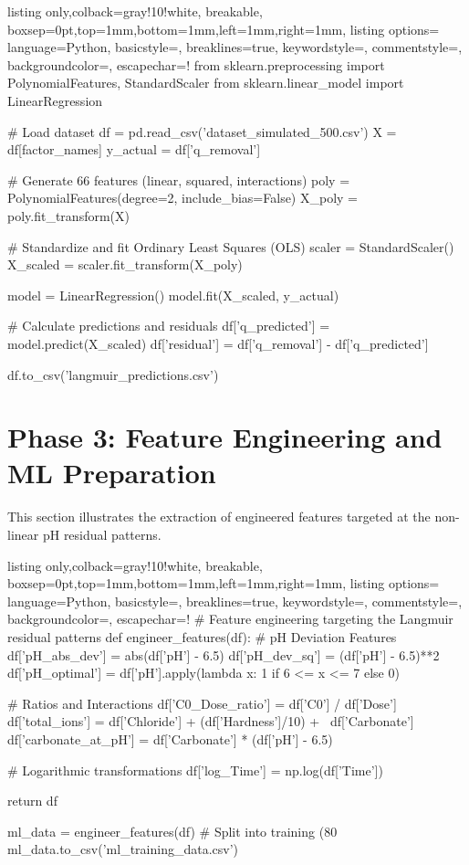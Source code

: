 \begin{tcblisting}{listing only,colback=gray!10!white, breakable, boxsep=0pt,top=1mm,bottom=1mm,left=1mm,right=1mm,
listing options={
language=Python,
basicstyle=\small\ttfamily, 
breaklines=true,
keywordstyle=\color{blue}, 
commentstyle=\color{gray},
backgroundcolor=\color{gray!10},
escapechar=!}}
from sklearn.preprocessing import PolynomialFeatures, StandardScaler
from sklearn.linear_model import LinearRegression

# Load dataset
df = pd.read_csv('dataset_simulated_500.csv')
X = df[factor_names]
y_actual = df['q_removal']

# Generate 66 features (linear, squared, interactions)
poly = PolynomialFeatures(degree=2, include_bias=False)
X_poly = poly.fit_transform(X)

# Standardize and fit Ordinary Least Squares (OLS)
scaler = StandardScaler()
X_scaled = scaler.fit_transform(X_poly)

model = LinearRegression()
model.fit(X_scaled, y_actual)

# Calculate predictions and residuals
df['q_predicted'] = model.predict(X_scaled)
df['residual'] = df['q_removal'] - df['q_predicted']

df.to_csv('langmuir_predictions.csv')
\end{tcblisting}

\section{Phase 3: Feature Engineering and ML Preparation}
This section illustrates the extraction of engineered features targeted at the non-linear pH residual patterns.

\begin{tcblisting}{listing only,colback=gray!10!white, breakable, boxsep=0pt,top=1mm,bottom=1mm,left=1mm,right=1mm,
listing options={
language=Python,
basicstyle=\small\ttfamily, 
breaklines=true,
keywordstyle=\color{blue}, 
commentstyle=\color{gray},
backgroundcolor=\color{gray!10},
escapechar=!}}
# Feature engineering targeting the Langmuir residual patterns
def engineer_features(df):
    # pH Deviation Features
    df['pH_abs_dev'] = abs(df['pH'] - 6.5)
    df['pH_dev_sq'] = (df['pH'] - 6.5)**2
    df['pH_optimal'] = df['pH'].apply(lambda x: 1 if 6 <= x <= 7 else 0)
    
    # Ratios and Interactions
    df['C0_Dose_ratio'] = df['C0'] / df['Dose']
    df['total_ions'] = df['Chloride'] + (df['Hardness']/10) + \
                       df['Carbonate']
    df['carbonate_at_pH'] = df['Carbonate'] * (df['pH'] - 6.5)
    
    # Logarithmic transformations
    df['log_Time'] = np.log(df['Time'])
    
    return df

ml_data = engineer_features(df)
# Split into training (80%
ml_data.to_csv('ml_training_data.csv')
\end{tcblisting}

